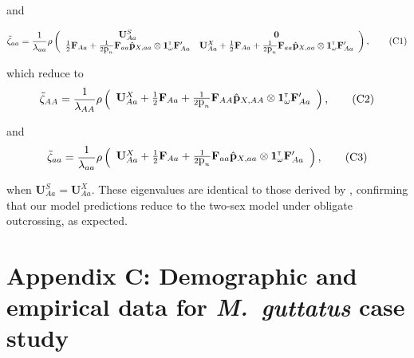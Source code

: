 \documentclass[11pt]{article}
\newcommand\numberthis{\addtocounter{equation}{1}\tag{\theequation}}
\def\mbf#1{\mathbf{#1}}
\newcommand{\tr}{{\mbox{\tiny \sf T}}}
\begin{document}
\noindent and

\begin{align*} \label{eq:eigaaOut}
	\tilde{\zeta}_{aa} = 
		\frac{1}{\lambda_{aa}}\rho\left(\begin{array}{cc}
\mathbf{U}^S_{Aa}  & \mathbf{0} \\
 \frac{1}{2} \mbf{F}_{Aa}+\frac{1}{2\mbox{p}_{n}}\mbf{F}_{aa} \hat{\mbf{p}}_{X,aa} \otimes \mathbf{1}^\tr_{\omega} \mathbf{F}_{Aa}^\prime &\mathbf{U}^X_{Aa} + \frac{1}{2} \mbf{F}_{Aa} +\frac{1}{2\mbox{p}_{n}} \mbf{F}_{aa} \hat{\mbf{p}}_{X,aa} \otimes \mathbf{1}^\tr_{\omega} \mathbf{F}_{Aa}^\prime
			\end{array} \right), \numberthis
\end{align*}

\noindent which reduce to 
\begin{align*} \label{eq:eigAATwoSex}
	\tilde{\zeta}_{AA} = 
		\frac{1}{\lambda_{AA}}\rho\left(\begin{array}{c}
\mathbf{U}^X_{Aa} + \frac{1}{2} \mbf{F}_{Aa} +\frac{1}{2\mbox{p}_{n}} \mbf{F}_{AA} \hat{\mbf{p}}_{X,AA} \otimes \mathbf{1}^\tr_{\omega} \mathbf{F}_{Aa}^\prime
			\end{array} \right), \numberthis
\end{align*}

\noindent and 
\begin{align*} \label{eq:eigaaTwoSex}
	\tilde{\zeta}_{aa} = 
		\frac{1}{\lambda_{aa}}\rho\left(\begin{array}{c}
\mathbf{U}^X_{Aa} + \frac{1}{2} \mbf{F}_{Aa} +\frac{1}{2\mbox{p}_{n}} \mbf{F}_{aa} \hat{\mbf{p}}_{X,aa} \otimes \mathbf{1}^\tr_{\omega} \mathbf{F}_{Aa}^\prime
			\end{array} \right), \numberthis
\end{align*}

\noindent when $\mathbf{U}^S_{Aa}=\mathbf{U}^X_{Aa}$. These eigenvalues are identical to those derived by \citet{deVriesCaswell2019a}, confirming that our model predictions reduce to the two-sex model under obligate outcrossing, as expected.




\section*{Appendix C: Demographic and empirical data for {\itshape M.~guttatus} case study}
\renewcommand{\theequation}{C\arabic{equation}}
\renewcommand{\thetable}{C\arabic{table}}
\setcounter{equation}{0}  %
\setcounter{table}{0}  %
\end{document}
